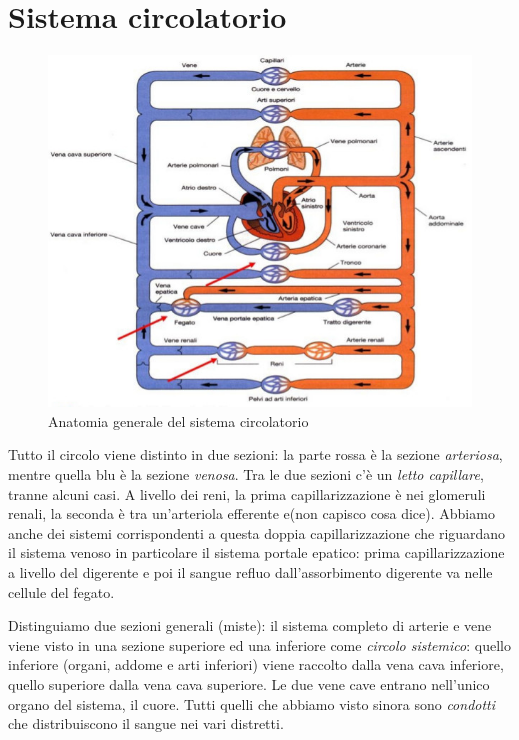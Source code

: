\documentclass[a4paper,12pt]{article}
\begin{document}
\section{Sistema circolatorio}
\begin{figure}[H]
\centering
\includegraphics[scale=0.4]{immagine/circolo.jpg}
\caption{Anatomia generale del sistema circolatorio}
\end{figure}

Tutto il circolo viene distinto in due sezioni: la parte rossa è la sezione \emph{arteriosa}, mentre quella blu è la sezione \emph{venosa}. Tra le due sezioni c'è un \emph{letto capillare}, tranne alcuni casi. A livello dei reni, la prima capillarizzazione è nei glomeruli renali, la seconda è tra un'arteriola efferente e(non capisco cosa dice). Abbiamo anche dei sistemi corrispondenti a questa doppia capillarizzazione che riguardano il sistema venoso in particolare il sistema portale epatico: prima capillarizzazione a livello del digerente e poi il sangue refluo dall'assorbimento digerente va nelle cellule del fegato.

Distinguiamo due sezioni generali (miste): il sistema completo di arterie e vene viene visto in una sezione superiore ed una inferiore come \emph{circolo sistemico}: quello inferiore (organi, addome e arti inferiori) viene raccolto dalla vena cava inferiore, quello superiore dalla vena cava superiore. Le due vene cave entrano nell'unico organo del sistema, il cuore. Tutti quelli che abbiamo visto sinora sono \emph{condotti} che distribuiscono il sangue nei vari distretti.
\end{document}
